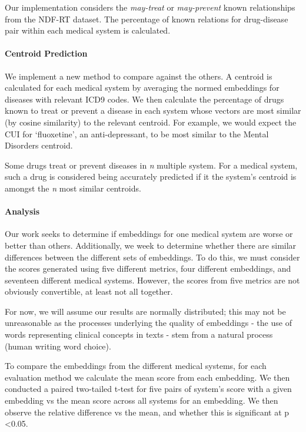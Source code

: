 \documentclass[10pt]{article}
\begin{document}
Our implementation considers the \emph{may-treat} or \emph{may-prevent} known relationships from the NDF-RT dataset. The percentage of known relations for drug-disease pair within each medical system is calculated. 

\paragraph{Centroid Prediction}
We implement a new method to compare against the others. A centroid is calculated for each medical system by averaging the normed embeddings for diseases with relevant ICD9 codes. We then calculate the percentage of drugs known to treat or prevent a disease in each system whose vectors are most similar (by cosine similarity) to the relevant centroid. For example, we would expect the CUI for `fluoxetine', an anti-depressant, to be most similar to the Mental Disorders centroid. 

Some drugs treat or prevent diseases in \emph{n} multiple system. For a medical system, such a drug is considered being accurately predicted if it the system's centroid is amongst the \emph{n} most similar centroids.  

\paragraph{Analysis}
Our work seeks to determine if embeddings for one medical system are worse or better than others. Additionally, we week to determine whether there are similar differences between the different sets of embeddings. To do this, we must consider the scores generated using five different metrics, four different embeddings, and seventeen different medical systems. However, the scores from five metrics are not obviously convertible, at least not all together. 

For now, we will assume our results are normally distributed; this may not be unreasonable as the processes underlying the quality of embeddings - the use of words representing clinical concepts in texts - stem from a natural process (human writing word choice).

To compare the embeddings from the different medical systems, for each evaluation method we calculate the mean score from each embedding. We then conducted a paired two-tailed t-test for five pairs of system's score with a given embedding vs the mean score across all systems for an embedding. We then observe the relative difference vs the mean, and whether this is significant at p \textless 0.05. 
\end{document}
